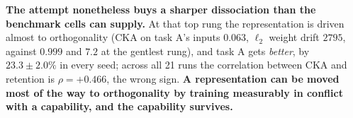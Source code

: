 \textbf{The attempt nonetheless buys a sharper dissociation than the benchmark
cells can supply.}  At that top rung the representation is driven almost to
orthogonality (CKA on task A's inputs $0.063$, $\ell_2$ weight drift $2795$,
against $0.999$ and $7.2$ at the gentlest rung), and task A gets \emph{better},
by $23.3\pm2.0\%$ in every seed; across all 21 runs the correlation between CKA
and retention is $\rho{=}{+}0.466$, the wrong sign.  \textbf{A representation can
be moved most of the way to orthogonality by training measurably in conflict with
a capability, and the capability survives.}
